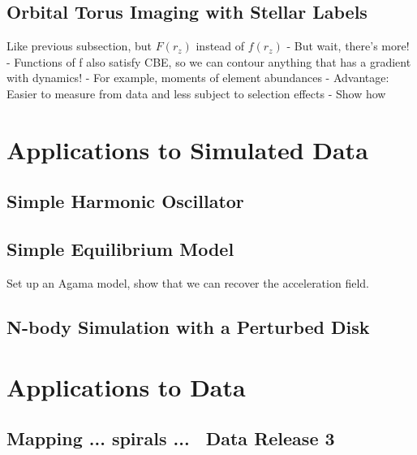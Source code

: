 \subsection{Orbital Torus Imaging with Stellar Labels} \label{sec:oti-labels}
Like previous subsection, but $F(r_z)$ instead of $f(r_z)$
- But wait, there's more!
- Functions of f also satisfy CBE, so we can contour anything that has a gradient with dynamics!
- For example, moments of element abundances
- Advantage: Easier to measure from data and less subject to selection effects
- Show how


\section{Applications to Simulated Data} \label{sec:applications-sim}


\subsection{Simple Harmonic Oscillator}
\label{sec:sim-sho}


\subsection{Simple Equilibrium Model}
\label{sec:sim-eq}

Set up an Agama model, show that we can recover the acceleration field.


\subsection{N-body Simulation with a Perturbed Disk}
\label{sec:sim-jason}


\section{Applications to Data} \label{sec:applications-data}

\subsection{Mapping ... spirals ... \gaia\ Data Release 3}
\label{sec:gaiadr3}

